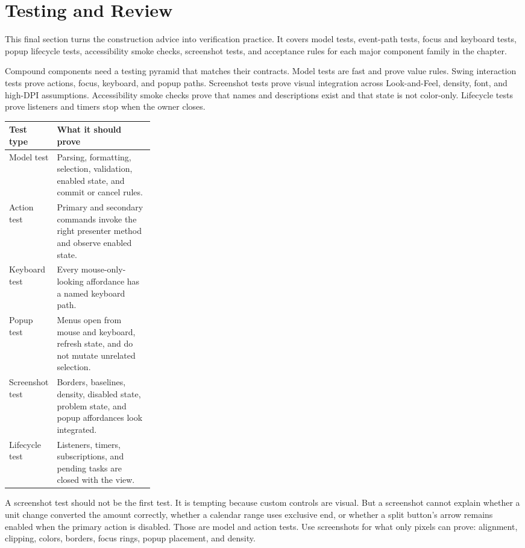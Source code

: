 \section{Testing and Review}

\begin{roadmapbox}
This final section turns the construction advice into verification practice. It
covers model tests, event-path tests, focus and keyboard tests, popup lifecycle
tests, accessibility smoke checks, screenshot tests, and acceptance rules for
each major component family in the chapter.
\end{roadmapbox}

Compound components need a testing pyramid that matches their contracts. Model tests are
fast and prove value rules. Swing interaction tests prove actions, focus, keyboard, and
popup paths. Screenshot tests prove visual integration across Look-and-Feel, density,
font, and high-DPI assumptions. Accessibility smoke checks prove that names and
descriptions exist and that state is not color-only. Lifecycle tests prove listeners and
timers stop when the owner closes.

\begin{tabularx}{0.96\linewidth}{@{}p{0.28\linewidth}X@{}}
\toprule
Test type & What it should prove\\
\midrule
Model test & Parsing, formatting, selection, validation, enabled state, and commit or cancel rules.\\
Action test & Primary and secondary commands invoke the right presenter method and observe enabled state.\\
Keyboard test & Every mouse-only-looking affordance has a named keyboard path.\\
Popup test & Menus open from mouse and keyboard, refresh state, and do not mutate unrelated selection.\\
Screenshot test & Borders, baselines, density, disabled state, problem state, and popup affordances look integrated.\\
Lifecycle test & Listeners, timers, subscriptions, and pending tasks are closed with the view.\\
\bottomrule
\end{tabularx}

A screenshot test should not be the first test. It is tempting because custom controls
are visual. But a screenshot cannot explain whether a unit change converted the amount
correctly, whether a calendar range uses exclusive end, or whether a split button's
arrow remains enabled when the primary action is disabled. Those are model and action
tests. Use screenshots for what only pixels can prove: alignment, clipping, colors,
borders, focus rings, popup placement, and density.

